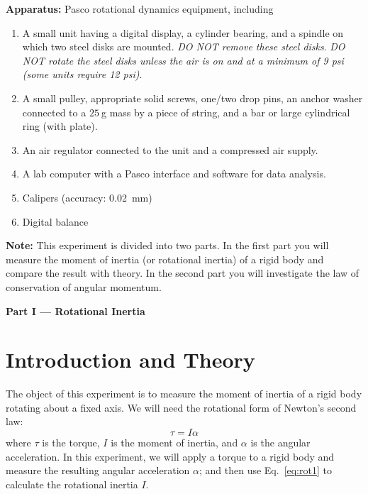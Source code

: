 \newexp


{\bf Apparatus:  }Pasco rotational dynamics equipment, including
\begin{enumerate}
\item A small unit having a digital display, a cylinder bearing, and a
spindle on which two steel disks are mounted.  {\em DO NOT remove these steel
disks}.  {\em DO NOT rotate the steel disks unless the air is on and at a minimum
of 9 psi (some units require 12 psi)}.
\item A small pulley, appropriate solid screws, one/two drop pins, an anchor washer connected to
a $25 \:$g mass by a piece of string, and a bar or large cylindrical ring (with plate).
\item An air regulator connected to the unit and a compressed air supply.
\item A lab computer with a Pasco interface and software for data analysis.
\item Calipers (accuracy: 0.02~mm)
\item Digital balance
\end{enumerate}


{\bf Note:  }This experiment is divided into two parts.  In the first
part you will measure
the moment of inertia (or rotational inertia) of a rigid body and
compare the result with theory. In the second
part you will investigate the law of conservation of angular momentum.

\begin{center}
{\Large {\bf Part I --- Rotational Inertia}}
\end{center}

\section*{Introduction and Theory}
The object of this experiment is to measure the moment of inertia of
a rigid body rotating about a fixed axis.  We will need
the rotational form of Newton's second law:
\begin{equation}
{\tau} = I {\alpha}  \label{eq:rot1}
\end{equation}
where ${\tau}$ is the torque, $I$ is the moment of inertia, and
${\alpha}$ is the angular acceleration.  In this experiment, we
will  apply a torque to  a rigid body
and measure the resulting
angular acceleration $\alpha$; and then use Eq.~\ref{eq:rot1} to
calculate the rotational inertia $I$.

